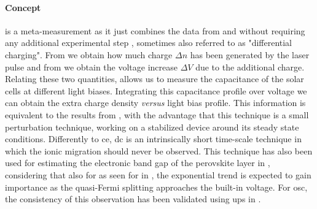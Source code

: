 	\paragraph{Concept}
	 is a meta-measurement as it just combines the data from  and  without requiring any additional experimental step \cite{ORegan2005,ORegan2006,Shuttle2008,Credgington2014,Maurano2011}, sometimes also referred to as "differential charging".
	From  we obtain how much charge $\Delta n$ has been generated by the laser pulse and from  we obtain the voltage increase $\Delta V$ due to the additional charge.
	Relating these two quantities,  allows us to measure the capacitance of the solar cells at different light biases.
	Integrating this capacitance profile over voltage we can obtain the extra charge density \textsl{versus} light bias profile.
	This information is equivalent to the results from , with the advantage that this technique is a small perturbation technique, working on a stabilized device around its steady state conditions.
	Differently to \gls{ce}, \gls{dc} is an intrinsically short time\hyp{}scale technique in which the ionic migration should never be observed.
	This technique has also been used for estimating the electronic band gap of the perovskite layer in , considering that also for  as seen for  in , the exponential trend is expected to gain importance as the quasi-Fermi splitting approaches the built-in voltage.
	For \gls{osc}, the consistency of this observation has been validated using \gls{ups} in .


